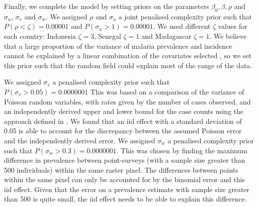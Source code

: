 \documentclass[10pt,letterpaper]{article}
\begin{document}
Finally, we complete the model by setting priors on the parameters $\beta_0, \beta, \rho$ and $\sigma_u$, $\sigma_v$ and $\sigma_w$.
We assigned $\rho$ and $\sigma_u$ a joint penalised complexity prior \cite{fuglstad2018constructing} such that $P(\rho < \zeta) = 0.00001$ and $P(\sigma_u > 1) = 0.00001$.
We used different $\zeta$ values for each country: Indonesia $\zeta = 3$, Senegal $\zeta = 1$ and Madagascar $\zeta = 1$.
We believe that a large proportion of the variance of malaria prevalence and incidence cannot be explained by a linear combination of the covariates selected \cite{bhatt2017improved}, so we set this prior such that the random field could explain most of the range of the data.

We assigned $\sigma_v$ a penalised complexity prior \cite{simpson2017penalising} such that $P(\sigma_v > 0.05) = 0.0000001$
This was based on a comparison of the variance of Poisson random variables, with rates given by the number of cases observed, and an independently derived upper and lower bound for the case counts using the approach defined in \cite{cibulskis2011worldwide}.
We found that an iid effect with a standard deviation of 0.05 is able to account for the discrepancy between the assumed Poisson error and the independently derived error.
We assigned $\sigma_w$ a penalised complexity prior such that $P(\sigma_w > 0.3) = 0.0000001$. 
This was chosen by finding the maximum difference in prevalence between point-surveys (with a sample size greater than 500 individuals) within the same raster pixel.
The differences between points within the same pixel can only be accounted for by the binomial error and this iid effect.
Given that the error on a prevalence estimate with sample size greater than 500 is quite small, the iid effect needs to be able to explain this difference.

%
%
%
%
%
%
%
\end{document}

